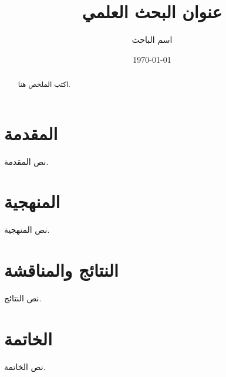 \documentclass[12pt,a4paper]{article}
\title{عنوان البحث العلمي}
\author{اسم الباحث}
\date{\today}
\begin{document}
\maketitle
\begin{abstract}
اكتب الملخص هنا.
\end{abstract}
\section{المقدمة}
نص المقدمة.
\section{المنهجية}
نص المنهجية.
\section{النتائج والمناقشة}
نص النتائج.
\section{الخاتمة}
نص الخاتمة.
\end{document}
